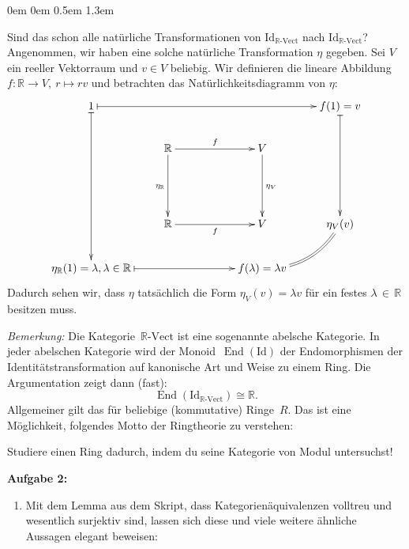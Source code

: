 \documentclass[a4paper,ngerman]{scrartcl}
\theoremstyle{definition}
\theoremstyle{plain}
\theoremstyle{remark}
\newcommand{\R}{\mathbb{R}}
\newcommand{\Vect}[1]{#1\text{-}\mathrm{Vect}}
\newcommand{\Id}{\mathrm{Id}}
\begin{document}
\begin{list}{}{0em \leftmargin0em \itemindent0.5em \itemsep 1.3em}
\begin{enumerate}
Sind das schon alle natürliche Transformationen von $\Id_{\Vect{\R}}$ nach $\Id_{\Vect{\R}}$? Angenommen, wir haben eine solche natürliche Transformation $\eta$ gegeben. Sei $V$ ein reeller Vektorraum und $v \in V$ beliebig. Wir definieren die lineare Abbildung $f : \R \to V,\ r \mapsto rv$ und betrachten das Natürlichkeitsdiagramm von $\eta$:
\[ \xymatrixcolsep{2pc}\xymatrix{
  1  \ar@{|->}[dddd] \ar@{|->}[rrrr] &&&& f(1) = v \ar@{|->}[ddd] \\
  & \R \ar[dd]_{\eta_{\R}} \ar[rr]^{f} && V \ar[dd]^{\eta_{V}} \\
  \\
  & \R \ar[rr]_{f} && V & \eta_{V}(v) \ar@{=}@/^1pc/[dl] \\
  \eta_{\R}(1) = \lambda, \lambda \in \R \ar@{|->}[rrr] &&& f(\lambda) = \lambda v
} \]
Dadurch sehen wir, dass $\eta$ tatsächlich die Form $\eta_{V}(v) = \lambda v$
für ein festes $\lambda\,\in\,\R$ besitzen muss.

\emph{Bemerkung:} Die Kategorie~$\Vect{\R}$ ist eine sogenannte abelsche
Kategorie. In jeder abelschen Kategorie wird der
Monoid~$\operatorname{End}(\Id)$ der Endomorphismen der
Identitätstransformation auf kanonische Art und Weise zu einem Ring. Die
Argumentation zeigt dann (fast):
\[ \operatorname{End}(\Id_{\Vect{\R}}) \cong \R. \]
Allgemeiner gilt das für beliebige (kommutative) Ringe~$R$. Das ist eine
Möglichkeit, folgendes Motto der Ringtheorie zu verstehen:
\begin{center}Studiere einen Ring dadurch, indem du seine Kategorie von Modul
untersuchst!\end{center}

\end{enumerate}

\item[\textbf{Aufgabe 2:}]\mbox{}

\begin{enumerate}
\item

Mit dem Lemma aus dem Skript, dass Kategorienäquivalenzen volltreu und wesentlich surjektiv sind, lassen sich diese und viele weitere ähnliche Aussagen elegant beweisen:


\end{enumerate}
\end{list}
\end{document}
